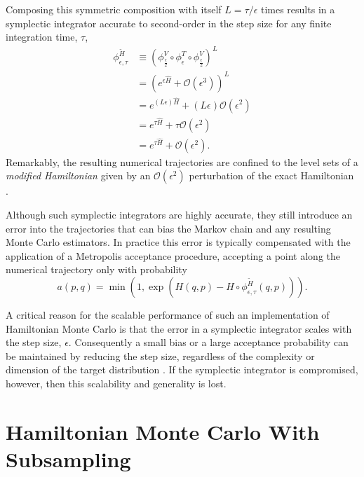 \documentclass{article}
\begin{document}
%
Composing this symmetric composition with itself $L = \tau / \epsilon$ times results in 
a symplectic integrator accurate to second-order in the step size for any finite integration 
time, $\tau$,
%
\begin{align*}
\phi^{\widetilde{H}}_{\epsilon, \tau}
&\equiv
\left( \phi^{V}_{\frac{\epsilon}{2}} \circ 
\phi^{T}_{\epsilon} \circ 
\phi^{V}_{\frac{\epsilon}{2}} \right)^{L}
\\
&=
\left( e^{ \epsilon \hat{H} }
+ \mathcal{O} \! \left( \epsilon^{3} \right) \right)^{L}
\\
&=
e^{ \left( L \epsilon \right) \hat{H} }
+ \left( L \epsilon \right) \mathcal{O} \! \left( \epsilon^{2} \right)
\\
&=
e^{ \tau \hat{H} }
+ \tau \mathcal{O} \! \left( \epsilon^{2} \right)
\\
&=
e^{ \tau \hat{H} }
+ \mathcal{O} \! \left( \epsilon^{2} \right).
\end{align*}
%
Remarkably, the resulting numerical trajectories are confined to the level sets
of a \textit{modified Hamiltonian} given by an $\mathcal{O} \! \left( \epsilon^{2} \right)$
perturbation of the exact Hamiltonian \cite{HairerEtAl:2006, BetancourtEtAl:2014b}.

Although such symplectic integrators are highly accurate, they still introduce an
error into the trajectories that can bias the Markov chain and any resulting
Monte Carlo estimators.  In practice this error is typically compensated with
the application of a Metropolis acceptance procedure, accepting a point along
the numerical trajectory only with probability
%
\begin{equation*}
a (p, q) = \min \left(1, 
\exp \! \left( H (q, p) - H \circ \phi^{\widetilde{H}}_{\epsilon, \tau} (q, p) \right) \right).
\end{equation*}

A critical reason for the scalable performance of such an implementation of 
Hamiltonian Monte Carlo is that the error in a symplectic integrator scales 
with the step size, $\epsilon$.  Consequently a small bias or a large acceptance 
probability can be maintained by reducing the step size, regardless of the complexity
or dimension of the target distribution \cite{BetancourtEtAl:2014b}.  If the symplectic
integrator is compromised, however, then this scalability and generality is lost.

\section{Hamiltonian Monte Carlo With Subsampling}
\end{document}
